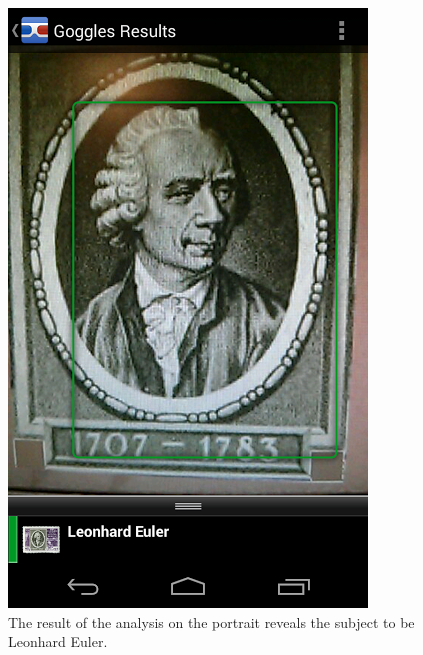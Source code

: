 \begin{figure}[h]
	\centering
	\includegraphics[width=0.8\columnwidth]{img/euler.png}
	\caption{The result of the analysis on the portrait reveals the subject to be Leonhard Euler.}
	\label{fig:euler}
\end{figure}
